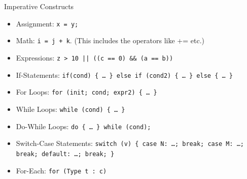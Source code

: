 \documentclass[aspectratio=169]{beamer}
\begin{document}
\begin{frame}{Imperative Constructs}
\begin{itemize}
\item Assignment: {\tt x = y;}
\item Math: {\tt i = j + k}. (This includes the operators like += etc.)
\item Expressions: {\tt z > 10 || ((c == 0) \&\& (a == b))}
\item If-Statements: {\tt if(cond) \{ \ldots~\} else if (cond2) \{ \ldots~\}  else  \{ \ldots~\} }
\item For Loops: {\tt for (init; cond; expr2) \{ \ldots~\} }
\item While Loops: {\tt while (cond) \{ \ldots~\} }
\item Do-While Loops: {\tt do \{ \ldots~\} while (cond); }
\item Switch-Case Statements: {\tt switch (v) \{ case N: \ldots; break; case M: \ldots; break; default: \ldots; break; \} }
\item For-Each: {\tt for (Type t : c)}
\end{itemize}
\end{frame}
\end{document}
